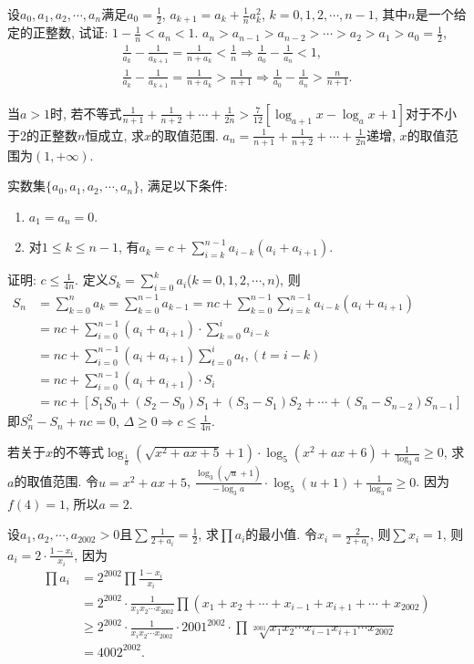 \bq{}{}
设$a_0, a_1, a_2, \cdots, a_n$满足$a_0=\frac12$, $a_{k+1}=a_k+\frac{1}{n}a_k^2$, $k=0,1,2,\cdots, n-1$,
其中$n$是一个给定的正整数, 试证: $1-\frac{1}{n}<a_n<1$.
\eq
\ba
$a_n>a_{n-1}>a_{n-2}>\cdots>a_2>a_1>a_0=\frac{1}{2}$,
\begin{align*}
 \frac{1}{a_k}-\frac{1}{a_{k+1}}=\frac{1}{n+a_k}<\frac{1}{n} \Longrightarrow\frac{1}{a_0}-\frac{1}{a_n}<1,\\
 \frac{1}{a_k}-\frac{1}{a_{k+1}}=\frac{1}{n+a_k}>\frac{1}{n+1} \Longrightarrow\frac{1}{a_0}-\frac{1}{a_n}>\frac{n}{n+1}.
\end{align*}
\ea

\bq{}{}
当$a>1$时, 若不等式$\frac{1}{n+1}+\frac{1}{n+2}+\cdots+\frac{1}{2n}>\frac{7}{12}\left[\log_{a+1}x-\log_{a}x+1\right]$对于不小于2的正整数$n$恒成立,
求$x$的取值范围.
\eq
\ba
$a_{n}=\frac{1}{n+1}+\frac{1}{n+2}+\cdots+\frac{1}{2n}$递增, $x$的取值范围为$(1, +\infty)$.
\ea

\bq{}{}
实数集$\{a_0, a_1, a_2, \cdots, a_n\}$, 满足以下条件: 
\begin{enumerate}[(1)]
 \item $a_1=a_n=0$.
 \item 对$1\le k\le n-1$, 有$a_k=c+\sum_{i=k}^{n-1}a_{i-k}(a_i+a_{i+1})$.
\end{enumerate}
证明: $c\le\frac{1}{4n}$.
\eq
\ba
定义$S_k=\sum_{i=0}^ka_i$($k=0,1,2,\cdots, n$), 则
\begin{align*}
 S_n
 & =\sum_{k=0}^{n}a_k
 =\sum_{k=0}^{n-1}a_{k-1}
 =nc+\sum_{k=0}^{n-1}\sum_{i=k}^{n-1}a_{i-k}(a_i+a_{i+1})\\
 & =nc+\sum_{i=0}^{n-1}(a_i+a_{i+1})\cdot\sum_{k=0}^{i}a_{i-k}\\
 & =nc+\sum_{i=0}^{n-1}(a_i+a_{i+1})\sum_{t=0}^{i}a_t, (t=i-k)\\
 & =nc+\sum_{i=0}^{n-1}(a_i+a_{i+1})\cdot S_i\\
 & =nc+\left[S_1S_0+(S_2-S_0)S_1+(S_3-S_1)S_2+\cdots+(S_n-S_{n-2})S_{n-1}\right]
\end{align*}
即$S_n^2-S_n+nc=0$, $\Delta\ge0\Longrightarrow c\le\frac{1}{4n}$.
\ea

\bq{}{}
若关于$x$的不等式$\log_{\frac{1}{a}}(\sqrt{x^2+ax+5}+1)\cdot\log_{5}(x^2+ax+6)+\frac{1}{\log_{3}a}\ge0$,
求$a$的取值范围.
\eq
\ba
令$u=x^2+ax+5$, $\frac{\log_3(\sqrt{u}+1)}{-\log_3a}\cdot\log_5(u+1)+\frac{1}{\log_3a}\ge0$.
因为$f(4)=1$, 所以$a=2$.
\ea

\bq{}{}
设$a_1, a_2, \cdots, a_{2002}>0$且$\sum\frac{1}{2+a_i}=\frac12$, 求$\prod a_i$的最小值.
\eq
\ba
令$x_i=\frac{2}{2+a_i}$, 则$\sum x_i=1$, 则$a_i=2\cdot\frac{1-x_i}{x_i}$, 
因为
\begin{align*}
 \prod a_i
 & =2^{2002}\prod\frac{1-x_i}{x_i}\\
 & =2^{2002}\cdot\frac{1}{x_1x_2\cdots x_{2002}}\prod(x_1+x_2+\cdots+x_{i-1}+x_{i+1}+\cdots+x_{2002})\\
 & \ge2^{2002}\cdot\frac{1}{x_ix_2\cdots x_{2002}}\cdot2001^{2002}\cdot\prod\sqrt[2001]{x_1x_2\cdots x_{i-1}x_{i+1}\cdots x_{2002}}\\
 &=4002^{2002}.
\end{align*}
\ea

